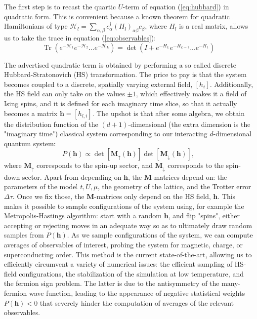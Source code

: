 \documentclass[a0,portrait]{a0poster}
\DeclareMathOperator{\Tr}{Tr} %
\begin{document}
\begin{multicols}{3}
The first step is to recast the quartic $U$-term of equation (\ref{eq:hubbard}) in quadratic form. This is convenient because a known theorem for quadratic Hamiltonians of type $\mathcal{H}_l = \sum_{\alpha,\beta} c_{\alpha}^\dagger (H_l)_{\alpha\beta} c_{\beta}$, where $H_l$ is a real matrix, allows us to take the trace in equation (\ref{eq:observables}):
\vspace{-0.3cm}
\begin{equation}
\Tr ( e^{-\mathcal{H}_1} e^{-\mathcal{H}_2} ... e^{-\mathcal{H}_L}) = \det ( I + e^{-H_L} e^{-H_{L-1}} ... e^{-H_1} )
\end{equation}

The advertised quadratic term is obtained by performing a so called discrete Hubbard-Stratonovich (HS) transformation. The price to pay is that the system becomes coupled to a discrete, spatially varying external field, $[h_i]$. Additionally, the HS field can only take on the values $\pm 1$, which effectively makes it a field of Ising spins, and it is defined for each imaginary time slice, so that it actually becomes a matrix $\bm h = [ h_{l, i} ]$. The upshot is that after some algebra, we obtain the distribution function of the $(d+1)$-dimensional (the extra dimension is the "imaginary time") classical system corresponding to our interacting $d$-dimensional quantum system:
\vspace{-0.5cm}
\begin{equation}
P ( \bm h ) \propto \det [ \bm M_{\uparrow} ( \bm h ) ] \det [ \bm M_{\downarrow} ( \bm h )  ] ,
\end{equation}
where $\bm M_{\uparrow}$ corresponds to the spin-up sector, and $\bm M_{\downarrow}$ corresponds to the spin-down sector. Apart from depending on $\bm h$, the $\bm M$-matrices depend on: the parameters of the model $t, U, \mu$, the geometry of the lattice, and the Trotter error $\Delta \tau$. Once we fix those, the $\bm M$-matrices only depend on the HS field, $\bm h$. This makes it possible to sample configurations of the system using, for example the Metropolis-Hastings algorithm: start with a random $\bm h$, and flip "spins", either accepting or rejecting moves in an adequate way so as to ultimately draw random samples from $P (\bm h)$. As we sample configurations of the system, we can compute averages of observables of interest, probing the system for magnetic, charge, or superconducting order. This method is the current state-of-the-art, allowing us to efficiently circumvent a variety of numerical issues: the efficient sampling of HS-field configurations, the stabilization of the simulation at low temperature, and the fermion sign problem. The latter is due to the antisymmetry of the many-fermion wave function, leading to the appearance of negative statistical weights $P ( \bm h) < 0$ that severely hinder the computation of averages of the relevant observables.


\end{multicols}
\end{document}
